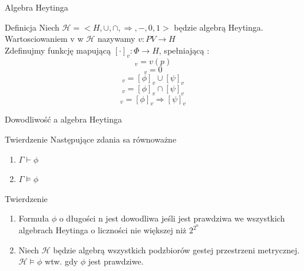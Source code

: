 \documentclass{beamer}
\begin{document}
\begin{frame}{Algebra Heytinga}
 \begin{block}{Definicja}
 Niech \( \mathcal{H} = < H, \cup, \cap, \Rightarrow, - , 0 ,1 >  \) będzie algebrą Heytinga.\\
  Wartosciowaniem v w \( \mathcal{H} \) nazywamy \( v : PV \rightarrow H\)\\
 Zdefinujmy funkcję mapującą  \( [ \cdot ]_v : \Phi \rightarrow H\), spełniającą :
 \begin{equation*}
 	[p]_v = v ( p)
 \end{equation*} 
 \begin{equation*}
 	[\bot]_v = 0
 \end{equation*} 
  \begin{equation*}
 	[\phi \vee \psi]_v = [\phi]_v \cup [\psi]_v
 \end{equation*}
  \begin{equation*}
 	[\phi \wedge \psi]_v = [\phi]_v \cap [\psi]_v 
 \end{equation*}
  \begin{equation*}
 	[\phi \rightarrow \psi]_v = [\phi]_v \Rightarrow [\psi]_v
 \end{equation*}
 \end{block}
\end{frame}

\begin{frame}{Dowodliwość a algebra Heytinga}
 \begin{block}{Twierdzenie}
Następujące zdania sa równoważne
	\begin{enumerate}
	\item \(\Gamma \vdash \phi\)
 	\item \(\Gamma \models \phi\) 

	\end{enumerate}
 \end{block}
 
 \begin{block}{Twierdzenie}
	\begin{enumerate}
	\item Formuła \(\phi\) o długości n jest dowodliwa jeśli jest prawdziwa we wszystkich algebrach Heytinga o liczności nie większej niż \( 2 ^ {2 ^ n}\)
 	\item Niech \(\mathcal{H}\) będzie algebrą wszystkich podzbiorów gestej przestrzeni metrycznej. \( \mathcal{H} \models \phi\) wtw. gdy \(\phi\) jest prawdziwe.

	\end{enumerate}
 \end{block}
\end{frame}
\end{document}

